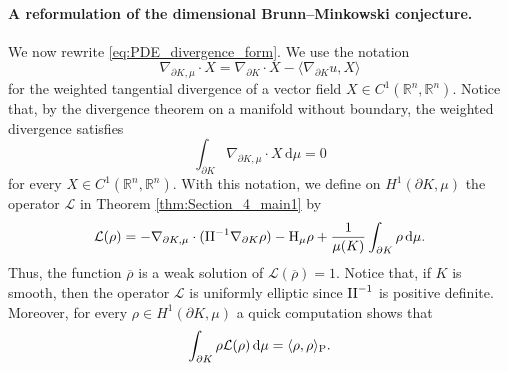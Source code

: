\documentclass[a4paper, 11pt]{article}
\newcommand{\R}{\mathbb{R}}
\theoremstyle{definition}
\newcommand{\di}{\, \mathrm{d}}
\begin{document}
\paragraph{A reformulation of the dimensional Brunn--Minkowski conjecture.} We now rewrite \eqref{eq:PDE_divergence_form}. We use the notation \[ \nabla_{\partial K,\mu}\cdot X = \nabla_{\partial K} \cdot X-\langle \nabla_{\partial K}u,X\rangle \] for the weighted tangential divergence of a vector field $X \in C^1(\R^n,\R^n)$. Notice that, by the divergence theorem on a manifold without boundary, the weighted divergence satisfies
\begin{equation}\label{eq:weighted_div}
    \int_{\partial K} \nabla_{\partial K, \mu} \cdot X \di \mu = 0
\end{equation}
for every $X \in C^1(\R^n,\R^n)$. With this notation, we define on $H^1(\partial K, \mu)$ the operator $\mathcal{L}$ in Theorem \ref{thm:Section_4_main1} by
\begin{equation}\label{def:Boundary_Elliptic_Operator}
\mathcal{L}(\rho)
=
-\nabla_{\partial K,\mu}\cdot({\rm II}^{-1}\nabla_{\partial K}\rho)
-{\rm H}_\mu \rho
+\frac{1}{\mu(K)}\int_{\partial K} \rho\di\mu.
\end{equation}
Thus, the function $\overline{\rho}$ is a weak solution of $\mathcal{L}(\overline{\rho})=1$. Notice that, if $K$ is smooth, then the operator $\mathcal{L}$ is uniformly elliptic since ${\rm II}^{-1}$ is positive definite. Moreover, for every $\rho \in H^1(\partial K, \mu)$ a quick computation shows that
\begin{equation}\label{eq:P_L_identity}
    \int_{\partial K} \rho \mathcal{L}(\rho) \di \mu = \langle \rho, \rho \rangle_{\rm P}.
\end{equation}
\end{document}
